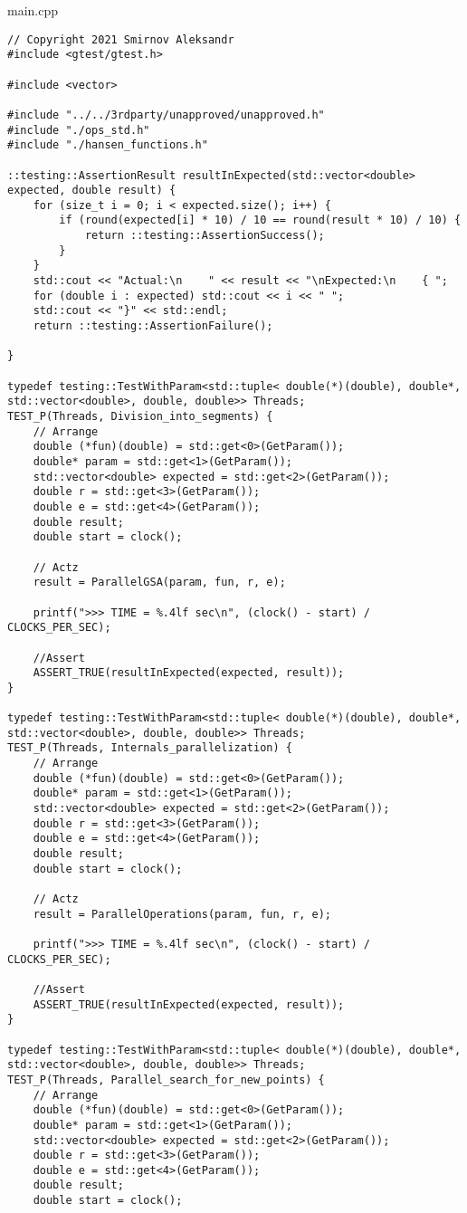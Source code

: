 \documentclass{report}
\begin{document}
main.cpp
\begin{lstlisting}
// Copyright 2021 Smirnov Aleksandr
#include <gtest/gtest.h>

#include <vector>

#include "../../3rdparty/unapproved/unapproved.h"
#include "./ops_std.h"
#include "./hansen_functions.h"

::testing::AssertionResult resultInExpected(std::vector<double> expected, double result) {
    for (size_t i = 0; i < expected.size(); i++) {
        if (round(expected[i] * 10) / 10 == round(result * 10) / 10) {
            return ::testing::AssertionSuccess();
        }
    }
    std::cout << "Actual:\n    " << result << "\nExpected:\n    { ";
    for (double i : expected) std::cout << i << " ";
    std::cout << "}" << std::endl;
    return ::testing::AssertionFailure();

}

typedef testing::TestWithParam<std::tuple< double(*)(double), double*, std::vector<double>, double, double>> Threads;
TEST_P(Threads, Division_into_segments) {
    // Arrange
    double (*fun)(double) = std::get<0>(GetParam());
    double* param = std::get<1>(GetParam());
    std::vector<double> expected = std::get<2>(GetParam());
    double r = std::get<3>(GetParam());
    double e = std::get<4>(GetParam());
    double result;
    double start = clock();

    // Actz
    result = ParallelGSA(param, fun, r, e);

    printf(">>> TIME = %.4lf sec\n", (clock() - start) / CLOCKS_PER_SEC);

    //Assert
    ASSERT_TRUE(resultInExpected(expected, result));
}

typedef testing::TestWithParam<std::tuple< double(*)(double), double*, std::vector<double>, double, double>> Threads;
TEST_P(Threads, Internals_parallelization) {
    // Arrange
    double (*fun)(double) = std::get<0>(GetParam());
    double* param = std::get<1>(GetParam());
    std::vector<double> expected = std::get<2>(GetParam());
    double r = std::get<3>(GetParam());
    double e = std::get<4>(GetParam());
    double result;
    double start = clock();
    
    // Actz
    result = ParallelOperations(param, fun, r, e);

    printf(">>> TIME = %.4lf sec\n", (clock() - start) / CLOCKS_PER_SEC);

    //Assert
    ASSERT_TRUE(resultInExpected(expected, result));
}

typedef testing::TestWithParam<std::tuple< double(*)(double), double*, std::vector<double>, double, double>> Threads;
TEST_P(Threads, Parallel_search_for_new_points) {
    // Arrange
    double (*fun)(double) = std::get<0>(GetParam());
    double* param = std::get<1>(GetParam());
    std::vector<double> expected = std::get<2>(GetParam());
    double r = std::get<3>(GetParam());
    double e = std::get<4>(GetParam());
    double result;
    double start = clock();


\end{lstlisting}
\end{document}
